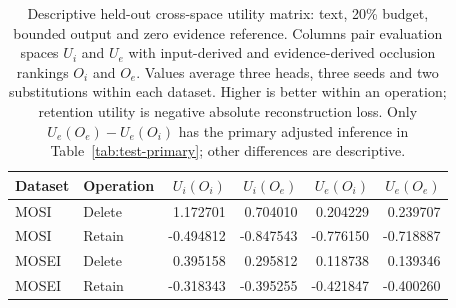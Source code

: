 \begin{table}[!htbp]\centering\small
\caption{Descriptive held-out cross-space utility matrix: text, 20\% budget, bounded output and zero evidence reference. Columns pair evaluation spaces $U_i$ and $U_e$ with input-derived and evidence-derived occlusion rankings $O_i$ and $O_e$. Values average three heads, three seeds and two substitutions within each dataset. Higher is better within an operation; retention utility is negative absolute reconstruction loss. Only $U_e(O_e)-U_e(O_i)$ has the primary adjusted inference in Table~\ref{tab:test-primary}; other differences are descriptive.}\label{tab:test-space-matrix}
\begin{tabular}{llrrrr}\toprule
Dataset & Operation & $U_i(O_i)$ & $U_i(O_e)$ & $U_e(O_i)$ & $U_e(O_e)$ \\\midrule
MOSI & Delete & 1.172701 & 0.704010 & 0.204229 & 0.239707 \\
MOSI & Retain & -0.494812 & -0.847543 & -0.776150 & -0.718887 \\
MOSEI & Delete & 0.395158 & 0.295812 & 0.118738 & 0.139346 \\
MOSEI & Retain & -0.318343 & -0.395255 & -0.421847 & -0.400260 \\
\bottomrule\end{tabular}
\end{table}
